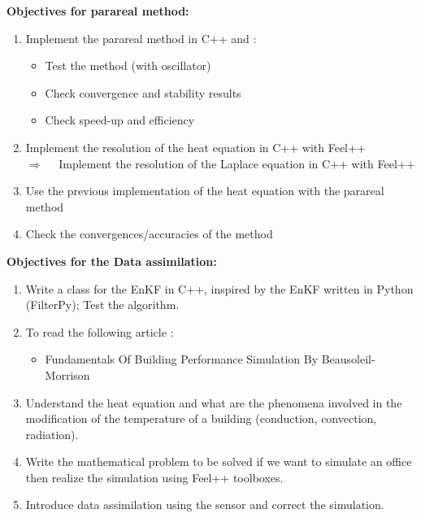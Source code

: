 \documentclass[12pt]{article}
\begin{document}
	\noindent \textbf{Objectives for parareal method:}
	\begin{enumerate}
		\item Implement the parareal method in C++ and :
		\begin{itemize}
			\item Test the method (with oscillator)
			\item Check convergence and stability results
			\item Check speed-up and efficiency 
		\end{itemize}
		\item Implement the resolution of the heat equation in C++ with Feel++ \\
		$\Rightarrow \quad $ Implement the resolution of the Laplace equation in C++ with Feel++
		\item Use the previous implementation of the heat equation with the parareal method
		\item Check the convergences/accuracies of the method
	\end{enumerate}
	\newpage
	\noindent \textbf{Objectives for the Data assimilation:}
	\begin{enumerate}
        \item Write a class for the EnKF in C++, inspired by the EnKF written in Python (FilterPy); Test the algorithm.
        \item To read the following article :
        \begin{itemize}
            \item Fundamentals Of Building Performance Simulation By Beausoleil-Morrison
        \end{itemize}
        
    \item Understand the heat equation and what are the phenomena involved in the modification of the temperature of a building (conduction, convection, radiation).
    \item Write the mathematical problem to be solved if we want to simulate an office then realize the simulation using Feel++ toolboxes.
    \item Introduce data assimilation using the sensor and correct the simulation.
    \end{enumerate}
\end{document}
